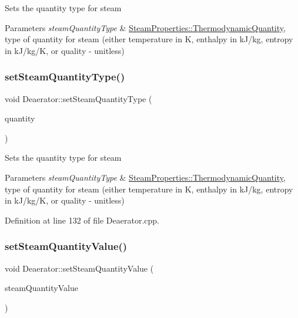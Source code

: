 Sets the quantity type for steam 
\begin{DoxyParams}{Parameters}
{\em steam\+Quantity\+Type} & \hyperlink{class_steam_properties_ae0294bedf7d178c2d8fb6aed0f62fbff}{Steam\+Properties\+::\+Thermodynamic\+Quantity}, type of quantity for steam (either temperature in K, enthalpy in k\+J/kg, entropy in k\+J/kg/K, or quality -\/ unitless) \\
\hline
\end{DoxyParams}
\mbox{\label{class_deaerator_a1aa3b3de064d148479af9576e717b6c2}} 
\subsubsection{\texorpdfstring{set\+Steam\+Quantity\+Type()}{setSteamQuantityType()}\hspace{0.1cm}{\footnotesize\ttfamily [3/3]}}
{\footnotesize\ttfamily void Deaerator\+::set\+Steam\+Quantity\+Type (\begin{DoxyParamCaption}\item[{\hyperlink{class_steam_properties_ae0294bedf7d178c2d8fb6aed0f62fbff}{Steam\+Properties\+::\+Thermodynamic\+Quantity}}]{quantity }\end{DoxyParamCaption})}

Sets the quantity type for steam 
\begin{DoxyParams}{Parameters}
{\em steam\+Quantity\+Type} & \hyperlink{class_steam_properties_ae0294bedf7d178c2d8fb6aed0f62fbff}{Steam\+Properties\+::\+Thermodynamic\+Quantity}, type of quantity for steam (either temperature in K, enthalpy in k\+J/kg, entropy in k\+J/kg/K, or quality -\/ unitless) \\
\hline
\end{DoxyParams}


Definition at line 132 of file Deaerator.\+cpp.

\mbox{\label{class_deaerator_a101399a8b66c3ff1fecf884fd1b1373d}} 
\subsubsection{\texorpdfstring{set\+Steam\+Quantity\+Value()}{setSteamQuantityValue()}\hspace{0.1cm}{\footnotesize\ttfamily [1/3]}}
{\footnotesize\ttfamily void Deaerator\+::set\+Steam\+Quantity\+Value (\begin{DoxyParamCaption}\item[{double}]{steam\+Quantity\+Value }\end{DoxyParamCaption})}

